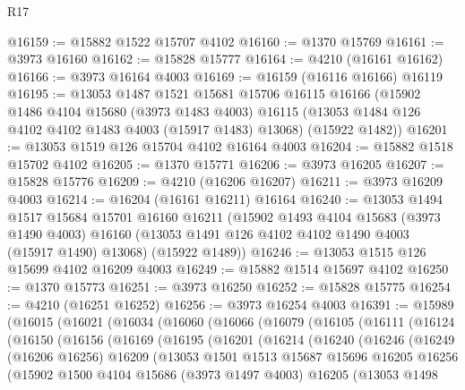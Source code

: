 \begin{lexlean}{R17}
\begin{coremodule}
@16159 := @15882 @1522 @15707 @4102
@16160 := @1370 @15769
@16161 := @3973 @16160
@16162 := @15828 @15777
@16164 := @4210 (@16161 @16162)
@16166 := @3973 @16164 @4003
@16169 := @16159 (@16116 @16166) @16119
@16195 := @13053
    @1487
    @1521
    @15681
    @15706
    @16115
    @16166
    (@15902
      @1486
      @4104
      @15680
      (@3973 @1483 @4003)
      @16115
      (@13053 @1484 @126 @4102 @4102 @1483 @4003 (@15917 @1483) @13068)
      (@15922 @1482))
@16201 := @13053 @1519 @126 @15704 @4102 @16164 @4003
@16204 := @15882 @1518 @15702 @4102
@16205 := @1370 @15771
@16206 := @3973 @16205
@16207 := @15828 @15776
@16209 := @4210 (@16206 @16207)
@16211 := @3973 @16209 @4003
@16214 := @16204 (@16161 @16211) @16164
@16240 := @13053
    @1494
    @1517
    @15684
    @15701
    @16160
    @16211
    (@15902
      @1493
      @4104
      @15683
      (@3973 @1490 @4003)
      @16160
      (@13053 @1491 @126 @4102 @4102 @1490 @4003 (@15917 @1490) @13068)
      (@15922 @1489))
@16246 := @13053 @1515 @126 @15699 @4102 @16209 @4003
@16249 := @15882 @1514 @15697 @4102
@16250 := @1370 @15773
@16251 := @3973 @16250
@16252 := @15828 @15775
@16254 := @4210 (@16251 @16252)
@16256 := @3973 @16254 @4003
@16391 := @15989
    (@16015
      (@16021
        (@16034
          (@16060
            (@16066
              (@16079
                (@16105
                  (@16111
                    (@16124
                      (@16150
                        (@16156
                          (@16169
                            (@16195
                              (@16201
                                (@16214
                                  (@16240
                                    (@16246
                                      (@16249
                                        (@16206 @16256)
                                        @16209
                                        (@13053
                                          @1501
                                          @1513
                                          @15687
                                          @15696
                                          @16205
                                          @16256
                                          (@15902
                                            @1500
                                            @4104
                                            @15686
                                            (@3973 @1497 @4003)
                                            @16205
                                            (@13053
                                              @1498

\end{coremodule}
\end{lexlean}
